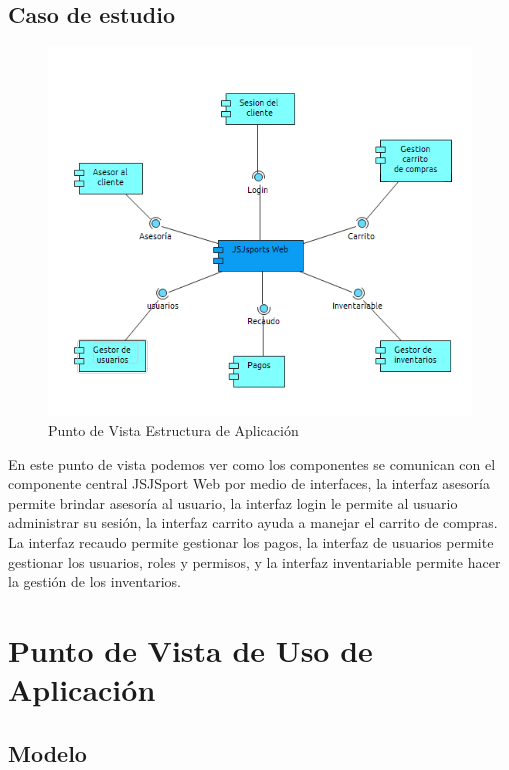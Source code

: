 \subsection{Caso de estudio}
\begin{figure}[th!]
	\centering
	\includegraphics[width=0.7\linewidth]{arquitectura/imagenes/PuntoVistaEstructuraAplicacion}
	\caption{Punto de Vista Estructura de Aplicación}
	\label{fig:vistaEstructuraaplicacion}
\end{figure}

En este punto de vista podemos ver como los componentes se  comunican con el componente  central JSJSport Web por medio de interfaces, la interfaz asesoría permite brindar asesoría al usuario, la interfaz login le permite al usuario administrar su sesión, la interfaz carrito ayuda a manejar el carrito de compras. La interfaz recaudo permite gestionar los pagos, la interfaz de usuarios permite gestionar los usuarios, roles y permisos, y la interfaz inventariable permite hacer la gestión de los inventarios.

\newpage



\section{Punto de Vista de Uso de Aplicación}

\subsection{Modelo}

